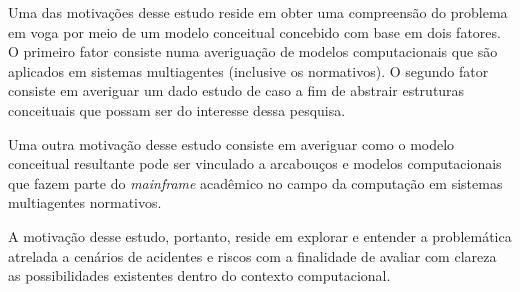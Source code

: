 Uma das motivações desse estudo reside em obter uma compreensão do problema em voga por meio de um modelo conceitual concebido com base em dois fatores. O primeiro fator consiste numa averiguação de modelos computacionais que são aplicados em sistemas multiagentes (inclusive os normativos). O segundo fator consiste em averiguar um dado estudo de caso a fim de abstrair estruturas conceituais que possam ser do interesse dessa pesquisa.

Uma outra motivação desse estudo consiste em averiguar como o modelo conceitual resultante pode ser vinculado a arcabouços e modelos computacionais que fazem parte do \textit{mainframe} acadêmico no campo da computação em sistemas multiagentes normativos.

A motivação desse estudo, portanto, reside em explorar e entender a problemática atrelada a cenários de acidentes e riscos com a finalidade de avaliar com clareza as possibilidades existentes dentro do contexto computacional.